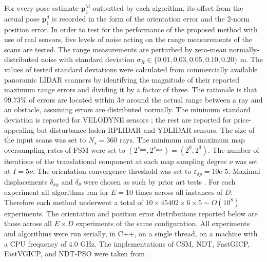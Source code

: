 For every pose estimate $\bm{p}_1^{\prime d}$ outputted by each algorithm, its
offset from the actual pose $\bm{p}_1^d$ is recorded in the form of the
orientation error and the $2$-norm position error.
In order to test for the performance of the proposed method with use of real
sensors, five levels of noise acting on the range measurements of the scans are
tested. The range measurements are perturbed by zero-mean normally-distributed
noise with standard deviation $\sigma_R \in \{0.01, 0.03, 0.05, 0.10, 0.20\}$ m.
The values of tested standard deviations were calculated from
commercially available panoramic LIDAR scanners by identifying the magnitude of
their reported maximum range errors and dividing it by a factor of three. The
rationale is that $99.73\%$ of errors are located within $3\sigma$ around the
actual range between a ray and an obstacle, assuming errors are distributed
normally. The minimum standard deviation is reported for
VELODYNE sensors \cite{velodyne_datasheet}; the rest are reported for
price-appealing but disturbance-laden RPLIDAR \cite{a2m8_datasheet} and YDLIDAR
\cite{ydlidar_datasheets} sensors. The size of the input scans was set
to $N_s=360$ rays. The minimum and maximum map oversampling rates of FSM were
set to $(2^{\nu_{\min}},2^{\nu_{\max}}) = (2^0,2^3)$.  The number of iterations
of the translational component at each map sampling degree $\nu$ was set at $I
= 5\nu$. The orientation convergence threshold was set to $\varepsilon_{\delta
p} = 10$e-$5$. Maximal displacements $\overline{\delta}_{xy}$ and
$\overline{\delta}_\theta$ were chosen as such by prior art tests \cite{plicp}.
For each experiment all algorithms ran for $E = 10$ times across all instances
of $D$. Therefore each method underwent a total of $10 \times 45402 \times 6
\times 5 \sim O(10^8)$ experiments.  The orientation and position error
distributions reported below are those across all $E \times D$ experiments of
the same configuration.  All experiments and algorithms were run serially, in
C++, on a single thread, on a machine with a CPU frequency of $4.0$ GHz. The
implementations of CSM, NDT, FastGICP, FastVGICP, and NDT-PSO were taken from
\cite{implementations}.
